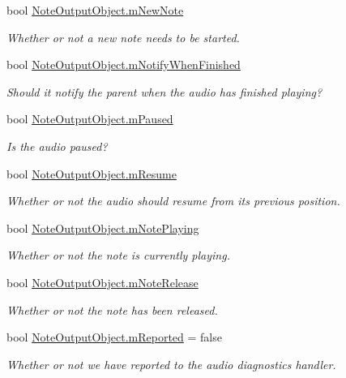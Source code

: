 \begin{DoxyCompactItemize}
bool \hyperlink{group___n_o_o_priv_var_gac537ec036adf0645dca2f31fbc5b3dec}{Note\+Output\+Object.\+m\+New\+Note}
\begin{DoxyCompactList}\small\item\em Whether or not a new note needs to be started. \end{DoxyCompactList}\item 
bool \hyperlink{group___n_o_o_priv_var_gaf72dd5943487433966b20b973be1e8b3}{Note\+Output\+Object.\+m\+Notify\+When\+Finished}
\begin{DoxyCompactList}\small\item\em Should it notify the parent when the audio has finished playing? \end{DoxyCompactList}\item 
bool \hyperlink{group___n_o_o_priv_var_ga50fe6047e6a199215fc70b9fc78ac7eb}{Note\+Output\+Object.\+m\+Paused}
\begin{DoxyCompactList}\small\item\em Is the audio paused? \end{DoxyCompactList}\item 
bool \hyperlink{group___n_o_o_priv_var_ga1f7a31f1aefc1633f1f435e3438a1efb}{Note\+Output\+Object.\+m\+Resume}
\begin{DoxyCompactList}\small\item\em Whether or not the audio should resume from its previous position. \end{DoxyCompactList}\item 
bool \hyperlink{group___n_o_o_priv_var_ga4417170b8fa977f05a0b4cd0d16412fd}{Note\+Output\+Object.\+m\+Note\+Playing}
\begin{DoxyCompactList}\small\item\em Whether or not the note is currently playing. \end{DoxyCompactList}\item 
bool \hyperlink{group___n_o_o_priv_var_ga88bfcc80d0cd20c81cd89d19d3231b84}{Note\+Output\+Object.\+m\+Note\+Release}
\begin{DoxyCompactList}\small\item\em Whether or not the note has been released. \end{DoxyCompactList}\item 
bool \hyperlink{group___n_o_o_priv_var_gafa20525b5515ab62d109f44ab45fba21}{Note\+Output\+Object.\+m\+Reported} = false
\begin{DoxyCompactList}\small\item\em Whether or not we have reported to the audio diagnostics handler. \end{DoxyCompactList}\item 

\end{DoxyCompactItemize}
